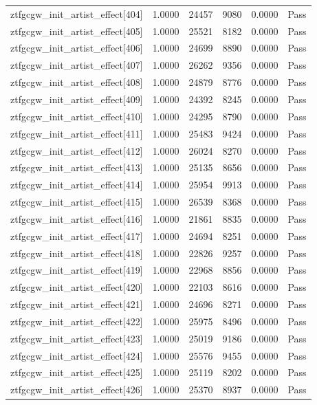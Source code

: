 \begin{table}[htbp]
\begin{tabular}{llrrll}
ztfgcgw\_init\_artist\_effect[404] & 1.0000 & 24457 & 9080 & 0.0000 & Pass \\
ztfgcgw\_init\_artist\_effect[405] & 1.0000 & 25521 & 8182 & 0.0000 & Pass \\
ztfgcgw\_init\_artist\_effect[406] & 1.0000 & 24699 & 8890 & 0.0000 & Pass \\
ztfgcgw\_init\_artist\_effect[407] & 1.0000 & 26262 & 9356 & 0.0000 & Pass \\
ztfgcgw\_init\_artist\_effect[408] & 1.0000 & 24879 & 8776 & 0.0000 & Pass \\
ztfgcgw\_init\_artist\_effect[409] & 1.0000 & 24392 & 8245 & 0.0000 & Pass \\
ztfgcgw\_init\_artist\_effect[410] & 1.0000 & 24295 & 8790 & 0.0000 & Pass \\
ztfgcgw\_init\_artist\_effect[411] & 1.0000 & 25483 & 9424 & 0.0000 & Pass \\
ztfgcgw\_init\_artist\_effect[412] & 1.0000 & 26024 & 8270 & 0.0000 & Pass \\
ztfgcgw\_init\_artist\_effect[413] & 1.0000 & 25135 & 8656 & 0.0000 & Pass \\
ztfgcgw\_init\_artist\_effect[414] & 1.0000 & 25954 & 9913 & 0.0000 & Pass \\
ztfgcgw\_init\_artist\_effect[415] & 1.0000 & 26539 & 8368 & 0.0000 & Pass \\
ztfgcgw\_init\_artist\_effect[416] & 1.0000 & 21861 & 8835 & 0.0000 & Pass \\
ztfgcgw\_init\_artist\_effect[417] & 1.0000 & 24694 & 8251 & 0.0000 & Pass \\
ztfgcgw\_init\_artist\_effect[418] & 1.0000 & 22826 & 9257 & 0.0000 & Pass \\
ztfgcgw\_init\_artist\_effect[419] & 1.0000 & 22968 & 8856 & 0.0000 & Pass \\
ztfgcgw\_init\_artist\_effect[420] & 1.0000 & 22103 & 8616 & 0.0000 & Pass \\
ztfgcgw\_init\_artist\_effect[421] & 1.0000 & 24696 & 8271 & 0.0000 & Pass \\
ztfgcgw\_init\_artist\_effect[422] & 1.0000 & 25975 & 8496 & 0.0000 & Pass \\
ztfgcgw\_init\_artist\_effect[423] & 1.0000 & 25019 & 9186 & 0.0000 & Pass \\
ztfgcgw\_init\_artist\_effect[424] & 1.0000 & 25576 & 9455 & 0.0000 & Pass \\
ztfgcgw\_init\_artist\_effect[425] & 1.0000 & 25119 & 8202 & 0.0000 & Pass \\
ztfgcgw\_init\_artist\_effect[426] & 1.0000 & 25370 & 8937 & 0.0000 & Pass \\

\end{tabular}
\end{table}

